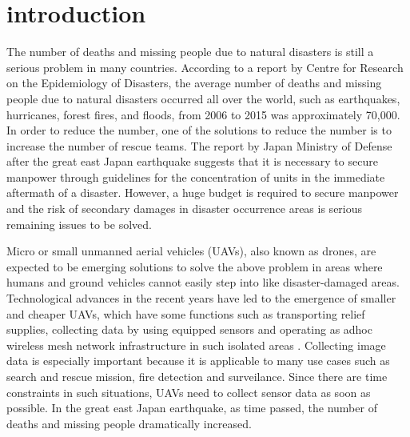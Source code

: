 \documentclass[journal]{IEEEtran}
\begin{document}
\section{introduction}\label{intro}
The number of deaths and missing people due to natural disasters is still a serious problem in many countries.
According to a report by Centre for Research on the Epidemiology of Disasters\cite{CRED2016}, the average number of deaths and missing people due to natural disasters occurred all over the world, such as earthquakes, hurricanes, forest fires, and floods, from 2006 to 2015 was approximately 70,000.
In order to reduce the number, one of the solutions to reduce the number is to increase the number of rescue teams.
The report by Japan Ministry of Defense after the great east Japan earthquake suggests that  it is necessary to secure manpower through guidelines for the concentration of units in the immediate aftermath of a disaster.
However, a huge budget is required to secure manpower and the risk of secondary damages in disaster occurrence areas is serious remaining issues to be solved\cite{disaster2011}.

Micro or small unmanned aerial vehicles (UAVs), also known as
drones, are expected to be emerging solutions to solve the above problem in areas where humans and ground vehicles cannot easily step into like disaster-damaged areas.
Technological advances in the recent years have led to the emergence of smaller and cheaper UAVs, which have some functions such as transporting relief supplies, collecting data by using equipped sensors and operating as adhoc wireless mesh network infrastructure in such isolated areas \cite{Andre2014,Erdelj2016,Felice2014}.
Collecting image data is especially important because it is applicable to many use cases such as search and rescue mission, fire detection and surveilance.
Since  there are time constraints in such situations, UAVs need to collect sensor data as soon as possible.
In the great east Japan earthquake, as time passed, the number of deaths and missing people  dramatically increased\cite{japan2011}.
\end{document}
